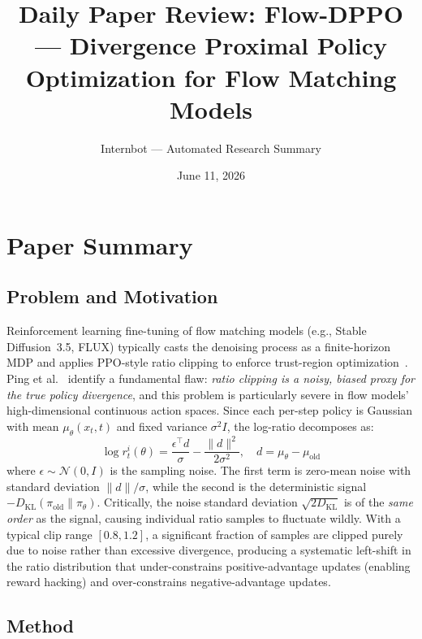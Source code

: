 \documentclass[11pt,a4paper]{article}
\title{Daily Paper Review: Flow-DPPO --- Divergence Proximal Policy\\Optimization for Flow Matching Models}
\author{Internbot --- Automated Research Summary}
\date{June 11, 2026}
\begin{document}
\maketitle

\section{Paper Summary}

\subsection{Problem and Motivation}

Reinforcement learning fine-tuning of flow matching models (e.g., Stable Diffusion~3.5, FLUX) typically casts the denoising process as a finite-horizon MDP and applies PPO-style ratio clipping to enforce trust-region optimization~\cite{liu2025flowgrpo}. Ping et al.~\cite{ping2026flowdppo} identify a fundamental flaw: \emph{ratio clipping is a noisy, biased proxy for the true policy divergence}, and this problem is particularly severe in flow models' high-dimensional continuous action spaces. Since each per-step policy is Gaussian with mean $\mu_\theta(x_t, t)$ and fixed variance $\sigma^2 I$, the log-ratio decomposes as:
\begin{equation}
\log r_t^i(\theta) = \frac{\epsilon^\top d}{\sigma} - \frac{\|d\|^2}{2\sigma^2}, \quad d = \mu_\theta - \mu_{\mathrm{old}}
\end{equation}
where $\epsilon \sim \mathcal{N}(0, I)$ is the sampling noise. The first term is zero-mean noise with standard deviation $\|d\|/\sigma$, while the second is the deterministic signal $-D_{\mathrm{KL}}(\pi_{\mathrm{old}} \| \pi_\theta)$. Critically, the noise standard deviation $\sqrt{2 D_{\mathrm{KL}}}$ is of the \emph{same order} as the signal, causing individual ratio samples to fluctuate wildly. With a typical clip range $[0.8, 1.2]$, a significant fraction of samples are clipped purely due to noise rather than excessive divergence, producing a systematic left-shift in the ratio distribution that under-constrains positive-advantage updates (enabling reward hacking) and over-constrains negative-advantage updates.

\subsection{Method}
\end{document}

